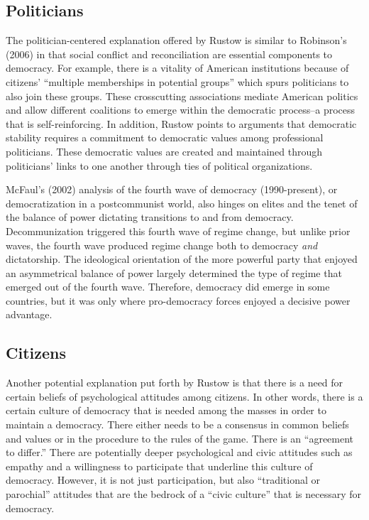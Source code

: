 \documentclass[12pt,]{article}
\begin{document}
\hypertarget{politicians}{%
\subsection{Politicians}\label{politicians}}

The politician-centered explanation offered by Rustow is similar to
Robinson's (2006) in that social conflict and reconciliation are
essential components to democracy. For example, there is a vitality of
American institutions because of citizens' ``multiple memberships in
potential groups'' which spurs politicians to also join these groups.
These crosscutting associations mediate American politics and allow
different coalitions to emerge within the democratic process--a process
that is self-reinforcing. In addition, Rustow points to arguments that
democratic stability requires a commitment to democratic values among
professional politicians. These democratic values are created and
maintained through politicians' links to one another through ties of
political organizations.

McFaul's (2002) analysis of the fourth wave of democracy (1990-present),
or democratization in a postcommunist world, also hinges on elites and
the tenet of the balance of power dictating transitions to and from
democracy. Decommunization triggered this fourth wave of regime change,
but unlike prior waves, the fourth wave produced regime change both to
democracy \emph{and} dictatorship. The ideological orientation of the
more powerful party that enjoyed an asymmetrical balance of power
largely determined the type of regime that emerged out of the fourth
wave. Therefore, democracy did emerge in some countries, but it was only
where pro-democracy forces enjoyed a decisive power advantage.

\hypertarget{citizens}{%
\subsection{Citizens}\label{citizens}}

Another potential explanation put forth by Rustow is that there is a
need for certain beliefs of psychological attitudes among citizens. In
other words, there is a certain culture of democracy that is needed
among the masses in order to maintain a democracy. There either needs to
be a consensus in common beliefs and values or in the procedure to the
rules of the game. There is an ``agreement to differ.'' There are
potentially deeper psychological and civic attitudes such as empathy and
a willingness to participate that underline this culture of democracy.
However, it is not just participation, but also ``traditional or
parochial'' attitudes that are the bedrock of a ``civic culture'' that
is necessary for democracy.
\end{document}
